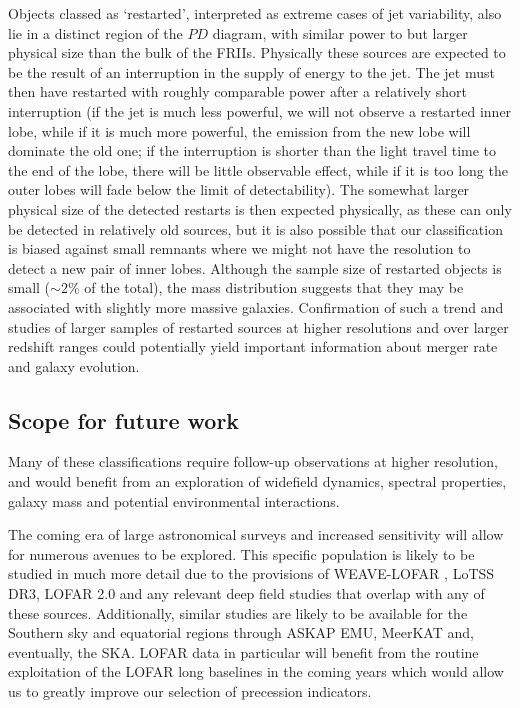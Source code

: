 \documentclass{aa}
\begin{document}
Objects classed as `restarted', interpreted as extreme cases of jet variability, also lie in a distinct region of the $PD$ diagram, with similar power to but larger physical size than the bulk of the FRIIs. Physically these sources are expected to be the result of an interruption in the supply of energy to the jet. The jet must then have restarted with roughly comparable power after a relatively short interruption (if the jet is much less powerful, we will not observe a restarted inner lobe, while if it is much more powerful, the emission from the new lobe will dominate the old one; if the interruption is shorter than the light travel time to the end of the lobe, there will be little observable effect, while if it is too long the outer lobes will fade below the limit of detectability). The somewhat larger physical size of the detected restarts is then expected physically, as these can only be detected in relatively old sources, but it is also possible that our classification is biased against small remnants where we might not have the resolution to detect a new pair of inner lobes. Although the sample size of restarted objects is small ($\sim 2$\% of the total), the mass distribution suggests that they may be associated with slightly more massive galaxies. Confirmation of such a trend and studies of larger samples of restarted sources at higher resolutions and over larger redshift ranges  could potentially yield important information about merger rate and galaxy evolution. 

\subsection{Scope for future work}
Many of these classifications require follow-up observations at higher resolution, and would benefit from an exploration of widefield dynamics, spectral properties, galaxy mass and potential environmental interactions. 

The coming era of large astronomical surveys and increased sensitivity will allow for numerous avenues to be explored. This specific population is likely to be studied in much more detail due to the provisions of WEAVE-LOFAR \citep{smith16}, LoTSS DR3, LOFAR 2.0 and any relevant deep field studies that overlap with any of these sources. Additionally, similar studies are likely to be available for the Southern sky and equatorial regions through ASKAP EMU, MeerKAT and, eventually, the SKA. LOFAR data in particular will benefit from the routine exploitation of the LOFAR long baselines in the coming years \citep{morabito22} which would allow us to greatly improve our selection of precession indicators. 
\end{document}
